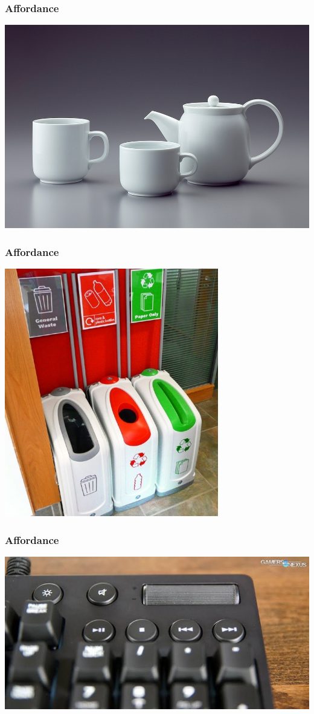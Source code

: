 \documentclass{beamer}
\begin{document}
\begin{frame}
\frametitle{Affordance}
\centering
\includegraphics[width=0.8\linewidth]{affordance3}
\end{frame}

\begin{frame}
\frametitle{Affordance}
\centering
\includegraphics[width=0.5\linewidth]{affordance4}
\end{frame}

\begin{frame}
	\frametitle{Affordance}
	\centering
	\includegraphics[width=0.8\linewidth]{orion}
\end{frame}
\end{document}
